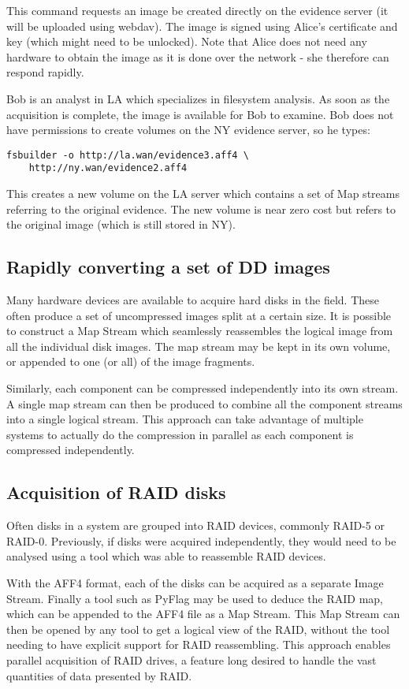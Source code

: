 \documentclass[10pt, conference]{IEEEtran}
\begin{document}
This command requests an image be created directly on the evidence
server (it will be uploaded using webdav). The image is signed using
Alice's certificate and key (which might need to be unlocked). Note
that Alice does not need any hardware to obtain the image as it is
done over the network - she therefore can respond rapidly.

Bob is an analyst in LA which specializes in filesystem analysis. As
soon as the acquisition is complete, the image is available for Bob to
examine. Bob does not have permissions to create volumes on the NY
evidence server, so he types:
\begin{lstlisting}
fsbuilder -o http://la.wan/evidence3.aff4 \
	http://ny.wan/evidence2.aff4
\end{lstlisting}
This creates a new volume on the LA server which contains a set of Map
streams referring to the original evidence. The new volume is near
zero cost but refers to the original image (which is still stored in
NY).

\subsection{Rapidly converting a set of DD images}
Many hardware devices are available to acquire hard disks in the
field. These often produce a set of uncompressed images split at a
certain size. It is possible to construct a Map Stream which
seamlessly reassembles the logical image from all the individual disk
images. The map stream may be kept in its own volume, or appended to
one (or all) of the image fragments.

Similarly, each component can be compressed independently into its own
stream. A single map stream can then be produced to combine all the
component streams into a single logical stream. This approach can take
advantage of multiple systems to actually do the compression in
parallel as each component is compressed independently.

\subsection{Acquisition of RAID disks}
Often disks in a system are grouped into RAID devices, commonly RAID-5
or RAID-0. Previously, if disks were acquired independently, they
would need to be analysed using a tool which was able to reassemble
RAID devices.

With the AFF4 format, each of the disks can be acquired as a separate
Image Stream. Finally a tool such as PyFlag \cite{pyflag_raid} may be
used to deduce the RAID map, which can be appended to the AFF4 file as
a Map Stream. This Map Stream can then be opened by any tool to get a
logical view of the RAID, without the tool needing to have explicit
support for RAID reassembling. This approach enables parallel
acquisition of RAID drives, a feature long desired to handle the vast
quantities of data presented by RAID.
\end{document}
